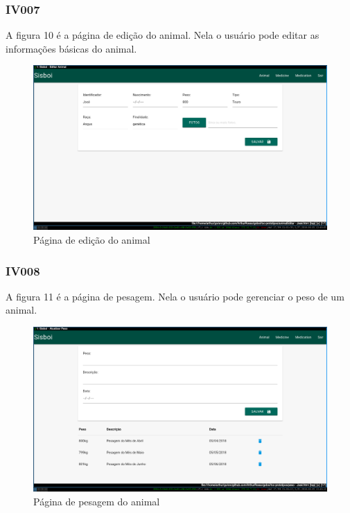 \documentclass[12pt]{article}
\begin{document}
\begin{titlepage}
\begin{center}
\begin{figure}[!h]
\begin{center}

	\end{center}
\end{figure}

\newpage
\subsubsection{IV007}

A figura 10 é a página de edição do animal. Nela o usuário pode editar as informações básicas do animal.
\begin{figure}[!h]
	\begin{center}
		\caption{Página de edição do animal}
		\includegraphics[width=13cm]{img/prototipos/editar.png}


	\end{center}
\end{figure}

\subsubsection{IV008}

A figura 11 é a página de pesagem. Nela o usuário pode gerenciar o peso de um animal.
\begin{figure}[!h]
	\begin{center}
		\caption{Página de pesagem do animal}
		\includegraphics[width=13cm]{img/prototipos/peso.png}


\end{center}
\end{figure}
\end{center}
\end{titlepage}
\end{document}
